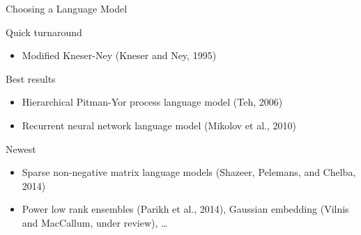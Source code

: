 \begin{frame}{Choosing a Language Model}
    \begin{block}{Quick turnaround}
        \begin{itemize}
        \item Modified Kneser-Ney (Kneser and Ney, 1995)
        \end{itemize}
    \end{block}
    
    \begin{block}{Best results}
        \begin{itemize}
        \item Hierarchical Pitman-Yor process language model (Teh, 2006)
        \item Recurrent neural network language model (Mikolov et al., 2010)
        \end{itemize}
\end{block}
    
    \begin{block}{Newest}
        \begin{itemize}
          \item Sparse non-negative matrix language models (Shazeer, Pelemans, and Chelba, 2014)
          \item Power low rank ensembles (Parikh et al., 2014), Gaussian embedding (Vilnis and MacCallum, under review), \ldots
       \end{itemize}
    \end{block}

\end{frame}



